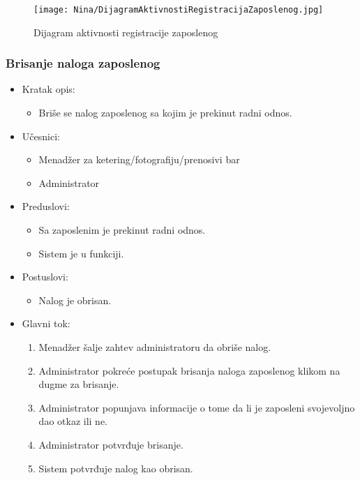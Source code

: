 \documentclass[a4paper]{article}
\begin{document}
\begin{figure}[H]
    \centering
    \texttt{[image: Nina/DijagramAktivnostiRegistracijaZaposlenog.jpg]}
    \caption{Dijagram aktivnosti registracije zaposlenog}
    \label{fig:RegistracijaZ}
\end{figure}


\subsubsection{Brisanje naloga zaposlenog}

\begin{itemize}
    \item Kratak opis: 
    \begin{itemize}
        \item Briše se nalog zaposlenog sa kojim je prekinut radni odnos.
    \end{itemize}
    \item Učesnici:
        \begin{itemize}
        \item Menadžer za ketering/fotografiju/prenosivi bar
        \item Administrator
    \end{itemize}
    \item Preduslovi:
        \begin{itemize}
            \item Sa zaposlenim je prekinut radni odnos.
            \item Sistem je u funkciji.
        \end{itemize}
    \item Postuslovi:
        \begin{itemize}
            \item Nalog je obrisan.
        \end{itemize}
    \item Glavni tok:
        \begin{enumerate}
            \item Menadžer šalje zahtev administratoru da obriše nalog.
            \item Administrator pokreće postupak brisanja naloga zaposlenog klikom na dugme za brisanje.
            \item Administrator popunjava informacije o tome da li je zaposleni svojevoljno dao otkaz ili ne.
            \item Administrator potvrđuje brisanje.
            \item Sistem potvrđuje nalog kao obrisan.
        \end{enumerate}
\end{itemize}
\end{document}
